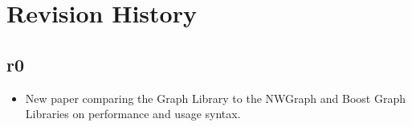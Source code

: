 \section{Revision History}

\subsection*{\paperno r0}

\begin{itemize}
    \item New paper comparing the Graph Library to the NWGraph and Boost Graph Libraries 
          on performance and usage syntax.
\end{itemize}
